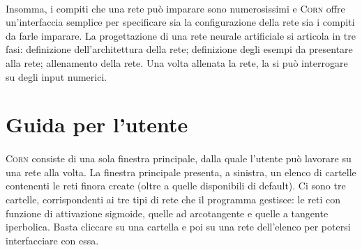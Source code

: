 \documentclass{article}
\begin{document}
\paragraph{} Insomma, i compiti che una rete può imparare sono numerosissimi e \textsc{Corn} offre un'interfaccia semplice per specificare sia la configurazione della rete sia i compiti da farle imparare. La progettazione di una rete neurale artificiale si articola in tre fasi: definizione dell'architettura della rete; definizione degli esempi da presentare alla rete; allenamento della rete. Una volta allenata la rete, la si può interrogare su degli input numerici.




\section{Guida per l'utente}

\paragraph{} \textsc{Corn} consiste di una sola finestra principale, dalla quale l'utente può lavorare su una rete alla volta. La finestra principale presenta, a sinistra, un elenco di cartelle contenenti le reti finora create (oltre a quelle disponibili di default). Ci sono tre cartelle, corrispondenti ai tre tipi di rete che il programma gestisce: le reti con funzione di attivazione sigmoide, quelle ad arcotangente e quelle a tangente iperbolica. Basta cliccare su una cartella e poi su una rete dell'elenco per potersi interfacciare con essa.
\end{document}
